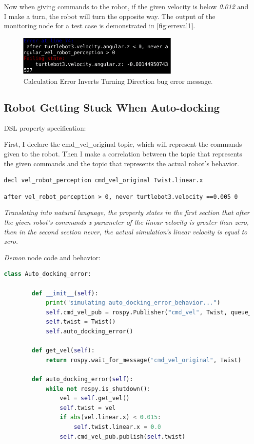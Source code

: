 Now when giving commands to the robot, if the given velocity is below \textit{0.012} and I make a turn, the robot will turn the opposite way. The output of the monitoring node for a test case is demonstrated in \autoref{fig:erreval1}.

\begin{figure}
\begin{center}
\includegraphics[width=8cm,height=2cm,keepaspectratio,]{images/erreval1.png}
\caption{Calculation Error Inverts Turning Direction bug error message.} \label{fig:erreval1}
\end{center}
\end{figure}


\subsection{Robot Getting Stuck When Auto-docking}
\label{ssec:robotgettingstuckwhenautodocking}

DSL property specification:

First, I declare the cmd\_vel\_original topic, which will represent the commands given to the robot.
Then I make a correlation between the topic that represents the given commands and the topic that represents the actual robot's behavior.

\texttt{decl vel\_robot\_perception cmd\_vel\_original Twist.linear.x}

\texttt{after vel\_robot\_perception > 0, never turtlebot3.velocity =={0.005} 0}

\textit{Translating into natural language, the property states in the first section that after the given robot's commands x parameter of the linear velocity is greater than zero, then in the second section never, the actual simulation's linear velocity is equal to zero.}

\textit{Demon} node code and behavior:

\begin{lstlisting}[language=python]
    class Auto_docking_error:

        def __init__(self):
            print("simulating auto_docking_error_behavior...")
            self.cmd_vel_pub = rospy.Publisher("cmd_vel", Twist, queue_size=1)
            self.twist = Twist()
            self.auto_docking_error()

        def get_vel(self):
            return rospy.wait_for_message("cmd_vel_original", Twist)

        def auto_docking_error(self):
            while not rospy.is_shutdown():
                vel = self.get_vel()
                self.twist = vel
                if abs(vel.linear.x) < 0.015:
                    self.twist.linear.x = 0.0
                self.cmd_vel_pub.publish(self.twist)
\end{lstlisting}

